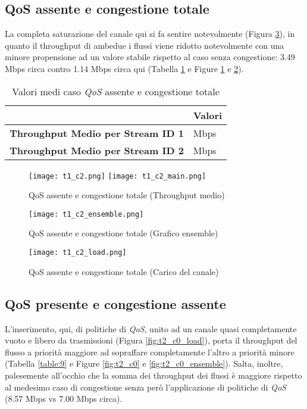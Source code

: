 \subsection[QoS assente e congestione totale]{QoS assente e congestione totale}
La completa saturazione del canale qui si fa sentire notevolmente (Figura \ref{fig:t1_c2_load}), in quanto il throughput di ambedue i flussi viene ridotto notevolmente con una minore propensione ad un valore stabile rispetto al caso senza congestione: 3.49 Mbps circa contro 1.14 Mbps circa qui (Tabella \ref{table:8} e Figure \ref{fig:t1_c2} e \ref{fig:t1_c2_ensemble}).
\begin{table}[h!]
    \centering
    \begin{tabular}{|>{\centering\arraybackslash}p{20em}|>{\centering\arraybackslash}p{7em}|} 
     \hline
     \textbf{} & \textbf{Valori} \\ 
     \hline
     \textbf{Throughput Medio per Stream ID 1} & 1.14 Mbps \\ 
     \hline
     \textbf{Throughput Medio per Stream ID 2} & 1.19 Mbps \\
     \hline
    \end{tabular}
    \caption{Valori medi caso \textit{QoS} assente e congestione totale}
    \label{table:8}
\end{table}

\begin{figure}[h!]
    \centering
    \texttt{[image: t1\_c2.png]}
    \texttt{[image: t1\_c2\_main.png]}
    \caption{QoS assente e congestione totale (Throughput medio)}
    \label{fig:t1_c2}
\end{figure}

\begin{figure}[h!]
    \centering
    \texttt{[image: t1\_c2\_ensemble.png]}
    \caption{QoS assente e congestione totale (Grafico ensemble)}
    \label{fig:t1_c2_ensemble}
\end{figure}

\begin{figure}[h!]
    \centering
    \texttt{[image: t1\_c2\_load.png]}
    \caption{QoS assente e congestione totale (Carico del canale)}
    \label{fig:t1_c2_load}
\end{figure}
\clearpage
\newpage
\subsection[QoS presente e congestione assente]{QoS presente e congestione assente}
L'inserimento, qui, di politiche di \textit{QoS}, unito ad un canale quasi completamente vuoto e libero da trasmissioni (Figura \ref{fig:t2_c0_load}), porta il throughput del flusso a priorità maggiore ad sopraffare completamente l'altro a priorità minore (Tabella \ref{table:9} e Figure \ref{fig:t2_c0} e \ref{fig:t2_c0_ensemble}). Salta, inoltre, palesemente all'occhio che la somma dei throughput dei flussi è maggiore rispetto al medesimo caso di congestione senza però l'applicazione di politiche di \textit{QoS} (8.57 Mbps vs 7.00 Mbps circa).

